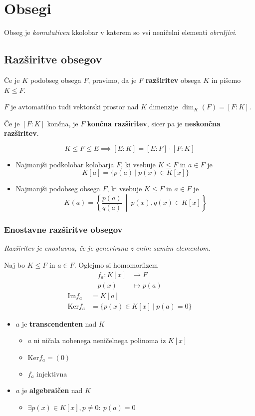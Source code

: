 
\section*{Obsegi}
Obseg je \emph{komutativen} kkolobar v katerem so vsi neničelni elementi \emph{obrnljivi}.

\subsection*{Razširitve obsegov}
Če je $K$ podobseg obsega $F$, pravimo, da je $F$ \textbf{razširitev} obsega $K$ in pišemo $K \leq F$.

$F$ je avtomatično tudi vektorski prostor nad $K$ dimenzije $\dim_K(F) = [F:K]$.

Če je $[F:K]$ končna, je $F$ \textbf{končna razširitev}, sicer pa je \textbf{neskončna razširitev}.

\[ K \leq F \leq E \implies [E:K] = [E:F] \cdot [F:K] \]

\begin{itemize}
	\item Najmanjši podkolobar kolobarja $F$, ki vsebuje $K \leq F$ in $a \in F$ je
	\[K[a] = \{p(a)\ |\ p(x) \in K[x]\}\]
	\item Najmanjši podobseg obsega $F$, ki vsebuje $K \leq F$ in $a \in F$ je
	\[K(a) = \left\{ \frac{ p(a) }{ q(a) }\ \middle|\ p(x), q(x) \in K[x] \right\} \]
\end{itemize}

\subsubsection*{Enostavne razširitve obsegov}
\emph{Razširitev je enostavna, če je generirana z enim samim elementom.}

Naj bo $K \leq F$ in $a \in F$. Oglejmo si homomorfizem
\begin{align*}
	f_a: K[x] &\to F \\
		p(x) & \mapsto p(a)
\end{align*}
\begin{align*}
	\text{Im}f_a &= K[a] \\
	\text{Ker}f_a &= \{ p(x) \in K[x]\ |\ p(a) = 0\}
\end{align*}

\renewcommand{\labelitemii}{$\iff$}
\begin{itemize}
	\item $a$ je \textbf{transcendenten} nad $K$
	\begin{itemize}
		\item $a$ ni ničala nobenega neničelnega polinoma iz $K[x]$
		\item $\text{Ker} f_a = (0)$
		\item $f_a$ injektivna
	\end{itemize}
	\item $a$ je \textbf{algebraičen} nad $K$
	\begin{itemize}
		\item $\exists p(x) \in K[x], p \neq 0:\ p(a) = 0$
	\end{itemize}
\end{itemize}

